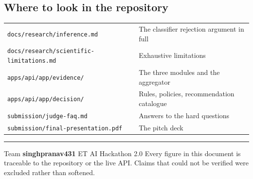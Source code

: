 \documentclass[11pt,a4paper]{article}
\newcommand{\code}[1]{\texttt{\small #1}}
\begin{document}
\subsection{Where to look in the repository}

\begin{center}
\small
\begin{tabularx}{\linewidth}{@{}l X@{}}
\toprule
\code{docs/research/inference.md} & The classifier rejection argument in full \\
\code{docs/research/scientific-limitations.md} & Exhaustive limitations \\
\code{apps/api/app/evidence/} & The three modules and the aggregator \\
\code{apps/api/app/decision/} & Rules, policies, recommendation catalogue \\
\code{submission/judge-faq.md} & Answers to the hard questions \\
\code{submission/final-presentation.pdf} & The pitch deck \\
\bottomrule
\end{tabularx}
\end{center}

\vspace{1em}
\noindent\rule{\linewidth}{0.4pt}
\vspace{0.4em}

\noindent\footnotesize\color{vgrey}
Team \textbf{singhpranav431} \quad\textbullet\quad ET AI Hackathon 2.0
\quad\textbullet\quad
Every figure in this document is traceable to the repository or the live API.
Claims that could not be verified were excluded rather than softened.
\end{document}
